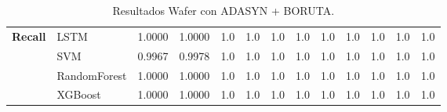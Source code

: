 \begin{table}[h]
\begin{adjustbox}{max width=11cm}
\begin{tabular}{|c|l|r|r|r|r|r|r|r|r|r|r|r|}
			\hline
			\textbf{Recall} & LSTM &  1.0000 &  1.0000 &  1.0 &  1.0 &  1.0 &  1.0 &  1.0 &  1.0 &  1.0 &  1.0 &  1.0 \\
			& SVM &  0.9967 &  0.9978 &  1.0 &  1.0 &  1.0 &  1.0 &  1.0 &  1.0 &  1.0 &  1.0 &  1.0 \\
			& RandomForest &  1.0000 &  1.0000 &  1.0 &  1.0 &  1.0 &  1.0 &  1.0 &  1.0 &  1.0 &  1.0 &  1.0 \\
			& XGBoost &  1.0000 &  1.0000 &  1.0 &  1.0 &  1.0 &  1.0 &  1.0 &  1.0 &  1.0 &  1.0 &  1.0 \\
			\hline
		\end{tabular}
	\end{adjustbox}
	\caption{Resultados Wafer con ADASYN + BORUTA.}
	\label{tab:Wafer_ADASYN_BORUTA}
\end{table}
\newpage

